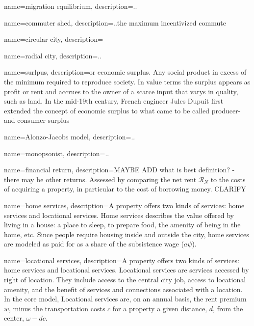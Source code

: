 




{
name=migration equilibrium,
description={..}
}

{
name=commuter shed,
description={..the maximum incentivized commute}
}

{
name=circular city,
description={}
}

{
name=radial city,
description={..}
}

{
name=surlpus,
description={or economic surplus. Any social product in excess of the minimum required to reproduce society. In value terms the surplus appears as profit or rent and accrues to the owner of a  scarce input that varys in quality, such as land. In the mid-19th century, French engineer Jules Dupuit first extended the concept of economic surplus to what came to be called producer- and consumer-surplus}
}

{
name=Alonzo-Jacobs model,
description={..}
}

{
name=monopsonist,
description={..}
}

{
name=financial return,
description={MAYBE ADD what is best definition? - there may be other returns. Assessed by comparing the net rent $\mathcal{R}_N$ to the costs of acquiring a property, in particular to the cost of borrowing money. CLARIFY}
}

{
name=home services,
description={A property offers two kinds of services: home services and \gls{locational services}. Home services describes the value offered by living in a house: a place to sleep, to prepare food, the amenity of being in the home, etc. Since people require housing inside and outside the city, home services are modeled as paid for as a share of the subsistence wage ($a \psi$).}
}

{
name=locational services,
description={A property offers two kinds of services: \gls{home services} and locational services. Locational services are services accessed by right of location. They include access to the central city job, access to locational amenity, and the benefit of services and connections associated with a location. In the core model, Locational services are, on an annual basis, the rent premium $w$, minus the transportation costs $c$ for a property a given distance, $d$, from the center, $\omega- {dc}$.}
}

